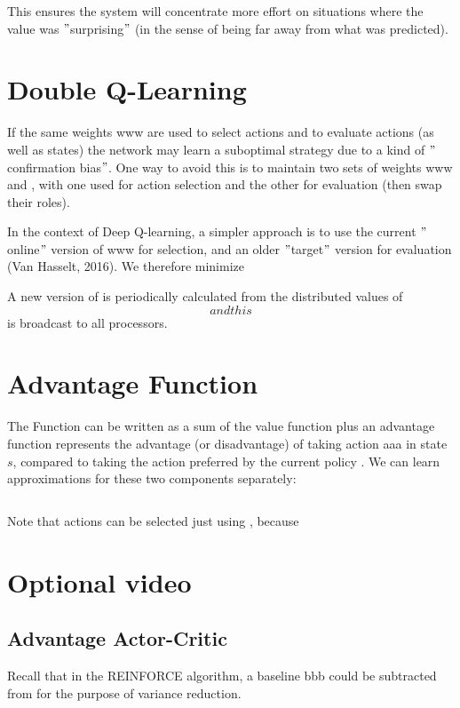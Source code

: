 \documentclass[11pt]{article}
\begin{document}
This ensures the system will concentrate more effort on situations where the
value was \("\)surprising\("\) (in the sense of being far away from what was predicted).

\section{Double Q-Learning}\label{sec:double-q-learning}
If the same weights www are used to select actions and to evaluate actions (as
well as states) the network may learn a suboptimal strategy due to a kind of
\("\)confirmation bias\("\).
One way to avoid this is to maintain two sets of weights www and , with one
used for action selection and the other for evaluation (then swap their roles).

In the context of Deep Q-learning, a simpler approach is to use the current
\("\)online\("\) version of www for selection, and an older \("\)target\("\)
version for evaluation (Van Hasselt, 2016).
We therefore minimize

A new version of is periodically calculated from the distributed values of $$ and
this $$ is broadcast to all processors.

\section{Advantage Function}\label{sec:advantage-function}

The  Function  can be written as a sum of the value function  plus an advantage function
 represents the advantage (or disadvantage) of taking action aaa in state $s$,
compared to taking the action preferred by the current policy .
We can learn approximations for these two components separately:

\[\]

Note that actions can be selected just using , because

\section{Optional video}\label{sec:optional-video10}

\subsection{Advantage Actor-Critic}\label{subsec:advantage-actor-critic}
Recall that in the REINFORCE algorithm, a baseline bbb could be subtracted from
for the purpose of variance reduction.
\end{document}
